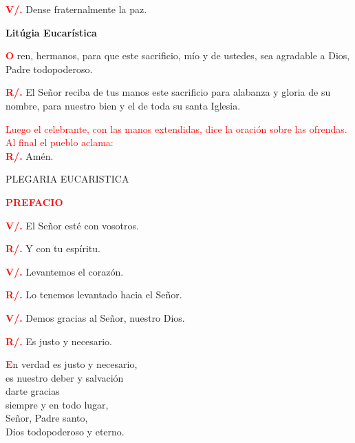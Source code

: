 \documentclass[12pt, letterpaper, spanish]{article}
\begin{document}
  \Large {\bfseries \textcolor{red}{V/.}} \hspace{0.5cm} Dense fraternalmente la paz. 

  \clearpage

  \begin{center}
  \Huge {\bfseries Lit\'ugia Eucar\'istica}
  \end{center}

  \lettrine[lines=2]{\bfseries \textcolor{red}{O}}{} \Large ren, hermanos, para que este sacrificio, m\'io y de ustedes, sea agradable a Dios, Padre todopoderoso. 

  \Large {\bfseries \textcolor{red}{R/.}} \hspace{0.5cm} El Se\~nor reciba de tus manos este sacrificio para alabanza y gloria de su nombre, para nuestro bien y el de toda su santa Iglesia. 

  \large {\textcolor{red}{Luego el celebrante, con las manos extendidas, dice la oraci\'on sobre las ofrendas. Al final el
  pueblo aclama:}}\\
  \Large {\bfseries \textcolor{red}{R/.}} \hspace{0.5cm} Am\'en.

  \begin{center}
    \Large PLEGARIA EUCARISTICA
  \end{center}


  \Large {\bfseries \textcolor{red}{PREFACIO}}

  \Large {\bfseries \textcolor{red}{V/.}} \hspace{0.5cm} El Se\~nor est\'e con vosotros.

  \Large {\bfseries \textcolor{red}{R/.}} \hspace{0.5cm} Y con tu esp\'iritu. 

  \Large {\bfseries \textcolor{red}{V/.}} \hspace{0.5cm} Levantemos el coraz\'on.

  \Large {\bfseries \textcolor{red}{R/.}} \hspace{0.5cm} Lo tenemos levantado hacia el Se\~nor. 

  \Large {\bfseries \textcolor{red}{V/.}} \hspace{0.5cm} Demos gracias al Se\~nor, nuestro Dios.

  \Large {\bfseries \textcolor{red}{R/.}} \hspace{0.5cm} Es justo y necesario.

  \lettrine[lines=2]{\bfseries \textcolor{red}{E}}{}\Large n verdad es justo y necesario,\\
      es nuestro deber y salvaci\'on\\
      darte gracias\\
      siempre y en todo lugar,\\
      Se\~nor, Padre santo,\\
      Dios todopoderoso y eterno.
\end{document}

